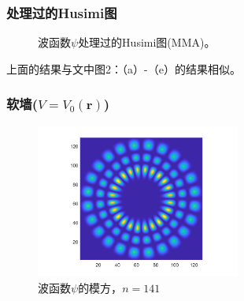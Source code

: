 \documentclass[UTF8]{beamer}
\begin{document}
\begin{frame}
	\frametitle{处理过的Husimi图}
	\begin{figure}
		\centering
		\caption{波函数$\psi$处理过的Husimi图(MMA)。}
	\end{figure}
	上面的结果与文中\cite{mason2015revealing}图2：（a）-（e）的结果相似。
\end{frame}

\begin{frame}
	\frametitle{软墙($V=V_0(\mathbf{r})$)}
	\begin{figure}
		\centering
		\includegraphics[width = 0.6\textwidth]{../images/figure/141_Psi.png}
		\caption{波函数$\psi$的模方，$n=141$}
	\end{figure}
\end{frame}
\end{document}
